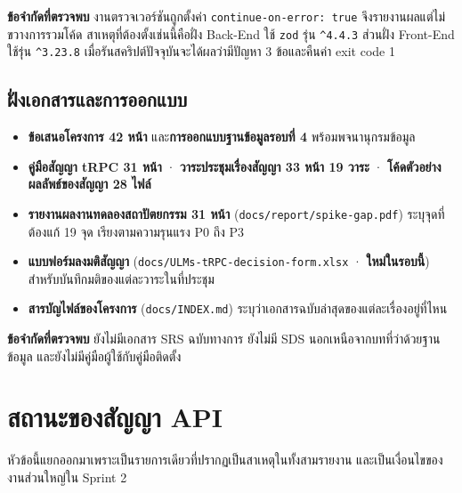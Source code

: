 \noindent\textbf{ข้อจำกัดที่ตรวจพบ} งานตรวจเวอร์ชันถูกตั้งค่า \texttt{continue-on-error: true} จึงรายงานผลแต่ไม่ขวางการรวมโค้ด สาเหตุที่ต้องตั้งเช่นนี้คือฝั่ง Back-End ใช้ \texttt{zod} รุ่น \texttt{\^{}4.4.3} ส่วนฝั่ง Front-End ใช้รุ่น \texttt{\^{}3.23.8} เมื่อรันสคริปต์ปัจจุบันจะได้ผลว่ามีปัญหา 3 ข้อและคืนค่า exit code 1

\subsection{ฝั่งเอกสารและการออกแบบ}

\begin{itemize}
  \item \textbf{ข้อเสนอโครงการ 42 หน้า} และ\textbf{การออกแบบฐานข้อมูลรอบที่ 4} พร้อมพจนานุกรมข้อมูล
  \item \textbf{คู่มือสัญญา tRPC 31 หน้า} · \textbf{วาระประชุมเรื่องสัญญา 33 หน้า 19 วาระ} · \textbf{โค้ดตัวอย่างผลลัพธ์ของสัญญา 28 ไฟล์}
  \item \textbf{รายงานผลงานทดลองสถาปัตยกรรม 31 หน้า} (\texttt{docs/report/spike-gap.pdf}) ระบุจุดที่ต้องแก้ 19 จุด เรียงตามความรุนแรง P0 ถึง P3
  \item \textbf{แบบฟอร์มลงมติสัญญา} (\texttt{docs/ULMs-tRPC-decision-form.xlsx} · \textbf{ใหม่ในรอบนี้}) สำหรับบันทึกมติของแต่ละวาระในที่ประชุม
  \item \textbf{สารบัญไฟล์ของโครงการ} (\texttt{docs/INDEX.md}) ระบุว่าเอกสารฉบับล่าสุดของแต่ละเรื่องอยู่ที่ไหน
\end{itemize}

\noindent\textbf{ข้อจำกัดที่ตรวจพบ} ยังไม่มีเอกสาร SRS ฉบับทางการ ยังไม่มี SDS นอกเหนือจากบทที่ว่าด้วยฐานข้อมูล และยังไม่มีคู่มือผู้ใช้กับคู่มือติดตั้ง

\clearpage
\section{สถานะของสัญญา API}
\label{sec:contract}

หัวข้อนี้แยกออกมาเพราะเป็นรายการเดียวที่ปรากฏเป็นสาเหตุในทั้งสามรายงาน และเป็นเงื่อนไขของงานส่วนใหญ่ใน Sprint 2

